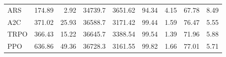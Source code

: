 \begin{samepage}
\begin{center}
\begin{tabular}{l|rr|rr|rr|rr}
    ARS          &   174.89 &     2.92 &    34739.7 &    3651.62 &   94.34 &    4.15 &   67.78 &    8.49 \\
    A2C          &   371.02 &    25.93 &    36588.7 &    3171.42 &   99.44 &    1.59 &   76.47 &    5.55 \\
    TRPO         &   366.43 &    15.22 &    36645.7 &    3388.54 &   99.54 &    1.39 &   71.96 &    5.88 \\
    PPO          &   636.86 &    49.36 &    36728.3 &    3161.55 &   99.82 &    1.66 &   77.01 &    5.71 \\
    \bottomrule
  \end{tabular}
\end{center}
\end{samepage}

